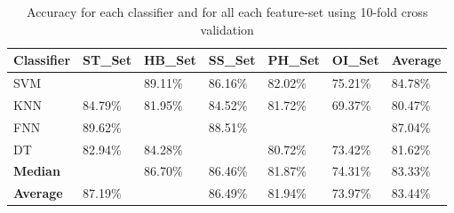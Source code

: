 \documentclass[journal,article,submit,moreauthors,pdftex]{Definitions/mdpi}
\begin{document}
\begin{table}[H]
	\caption{Accuracy for each classifier and for all each feature-set using 10-fold cross validation }
	\centering
	\begin{tabular}{p{3cm}p{2cm}p{2cm}p{2cm}p{2cm}p{2cm}p{2cm}}
		\toprule
		\textbf{Classifier} & \textbf{ST\_Set} & \textbf{HB\_Set} & \textbf{SS\_Set} & \textbf{PH\_Set} & \textbf{OI\_Set} & Average \\
		\midrule	
		SVM &  \cellcolor{gray!35}{91.41\%} & 89.11\% & 86.16\% &82.02\% & 75.21\% &84.78\%\\
		KNN & 84.79\% & 81.95\% & 84.52\% &81.72\% & 69.37\%& 80.47\% \\
		FNN & 89.62\% & \cellcolor{gray!35}{95.89\%} & 88.51\% &\cellcolor{gray!35}{83.31\%} & \cellcolor{gray!35}{77.88\%} & 87.04\%\\
		DT & 82.94\% & 84.28\% &  \cellcolor{gray!35}{86.76\%} &80.72\% & 73.42\% &81.62\%\\
		\bottomrule
		\textbf{Median} & \cellcolor{gray!35}{87.20‬\%} & 86.70\% &  86.46‬\% & 81.87‬\% & 74.31\%& 83.33\% \\
		\bottomrule
		\textbf{Average} & 87.19‬\% & \cellcolor{gray!35}{87.80\%} &  86.49\% & 81.94\% & 73.97\%& 83.44‬\% \\
		\bottomrule
	\end{tabular}
	\label{accuracy_classifier_featureset}
\end{table}
\end{document}
